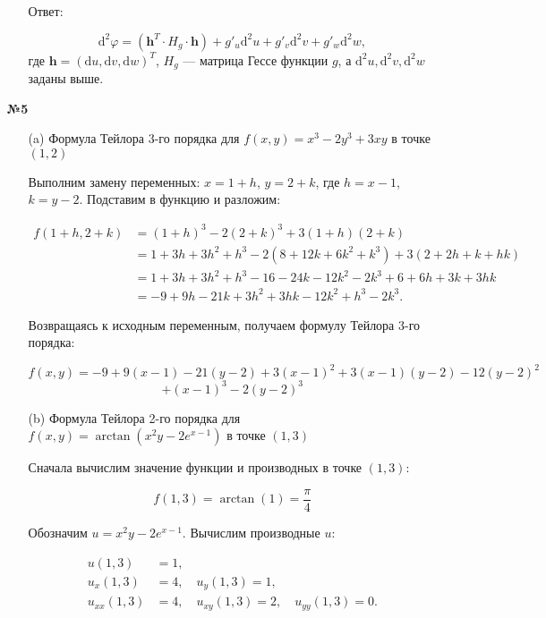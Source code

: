 \documentclass[a4paper]{article}
\begin{document}
\begin{enumerate}
\begin{enumerate}
        Ответ:
        
        \[
        \mathrm{d}^2\varphi = \left( \mathbf{h}^T \cdot H_g \cdot \mathbf{h} \right) + g'_u \mathrm{d}^2u + g'_v \mathrm{d}^2v + g'_w \mathrm{d}^2w,
        \]
        где \( \mathbf{h} = (\mathrm{d}u, \mathrm{d}v, \mathrm{d}w)^T \), \( H_g \) — матрица Гессе функции \( g \), а \( \mathrm{d}^2u, \mathrm{d}^2v, \mathrm{d}^2w \) заданы выше.\\
    \end{enumerate}

    \item[\textbf{№5}]\begin{enumerate}
        \item[(a)]Формула Тейлора 3-го порядка для $f(x, y) = x^3 - 2y^3 + 3xy$ в точке $(1, 2)$
        
        Выполним замену переменных: $x = 1 + h$, $y = 2 + k$, где $h = x - 1$, $k = y - 2$. Подставим в функцию и разложим:

        \[
        \begin{aligned}
        f(1 + h, 2 + k) &= (1 + h)^3 - 2(2 + k)^3 + 3(1 + h)(2 + k) \\
        &= 1 + 3h + 3h^2 + h^3 - 2(8 + 12k + 6k^2 + k^3) + 3(2 + 2h + k + hk) \\
        &= 1 + 3h + 3h^2 + h^3 - 16 - 24k - 12k^2 - 2k^3 + 6 + 6h + 3k + 3hk \\
        &= -9 + 9h - 21k + 3h^2 + 3hk - 12k^2 + h^3 - 2k^3.
        \end{aligned}
        \]

        Возвращаясь к исходным переменным, получаем формулу Тейлора 3-го порядка:

        \[
        f(x, y) = -9 + 9(x - 1) - 21(y - 2) + 3(x - 1)^2 + 3(x - 1)(y - 2) - 12(y - 2)^2\]
        \[ + (x - 1)^3 - 2(y - 2)^3
        \]

        \item[(b)]Формула Тейлора 2-го порядка для $f(x, y) = \arctan\left(x^2 y - 2e^{x-1}\right)$ в точке $(1, 3)$
                
        Сначала вычислим значение функции и производных в точке $(1, 3)$:

        \[
        f(1, 3) = \arctan(1) = \frac{\pi}{4}
        \]

        Обозначим $u = x^2 y - 2e^{x-1}$. Вычислим производные $u$:

        \[
        \begin{aligned}
        u(1, 3) &= 1, \\
        u_x(1, 3) &= 4, \quad u_y(1, 3) = 1, \\
        u_{xx}(1, 3) &= 4, \quad u_{xy}(1, 3) = 2, \quad u_{yy}(1, 3) = 0.
        \end{aligned}
        \]


\end{enumerate}
\end{enumerate}
\end{document}
